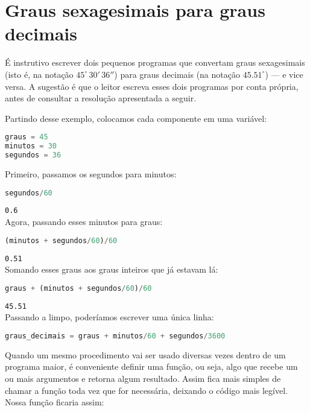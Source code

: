 \section{Graus sexagesimais para graus decimais}

É instrutivo escrever dois pequenos programas que convertam graus sexagesimais (isto é, na notação $45^{\circ}\,30'\,36''$) para graus decimais (na notação $45.51^{\circ}$) --- e vice versa. A sugestão é que o leitor escreva esses dois programas por conta própria, antes de consultar a resolução apresentada a seguir.

Partindo desse exemplo, colocamos cada componente em uma variável:

\begin{lstlisting}[language=Python]
graus = 45
minutos = 30
segundos = 36
\end{lstlisting}

\noindent Primeiro, passamos os segundos para minutos:

\begin{lstlisting}[language=Python]
segundos/60
\end{lstlisting}
\noindent\texttt{0.6}\\

\noindent Agora, passando esses minutos para graus:

\begin{lstlisting}[language=Python]
(minutos + segundos/60)/60
\end{lstlisting}
\noindent\texttt{0.51}\\

\noindent Somando esses graus aos graus inteiros que já estavam lá:

\begin{lstlisting}[language=Python]
graus + (minutos + segundos/60)/60
\end{lstlisting}
\noindent\texttt{45.51}\\

\noindent Passando a limpo, poderíamos escrever uma única linha:

\begin{lstlisting}[language=Python]
graus_decimais = graus + minutos/60 + segundos/3600
\end{lstlisting}

Quando um mesmo procedimento vai ser usado diversas vezes dentro de um programa maior, é conveniente definir uma função, ou seja, algo que recebe um ou mais argumentos e retorna algum resultado. Assim fica mais simples de chamar a função toda vez que for necessária, deixando o código mais legível. Nossa função ficaria assim:

